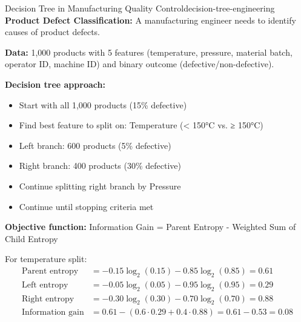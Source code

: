 \documentclass[12pt]{article}
\begin{document}
\begin{example}{Decision Tree in Manufacturing Quality Control}{decision-tree-engineering}
\textbf{Product Defect Classification:} A manufacturing engineer needs to identify causes of product defects.

\textbf{Data:} 1,000 products with 5 features (temperature, pressure, material batch, operator ID, machine ID) and binary outcome (defective/non-defective).

\textbf{Decision tree approach:}
\begin{itemize}
    \item Start with all 1,000 products (15\% defective)
    \item Find best feature to split on: Temperature (< 150°C vs. ≥ 150°C)
    \item Left branch: 600 products (5\% defective)
    \item Right branch: 400 products (30\% defective)
    \item Continue splitting right branch by Pressure
    \item Continue until stopping criteria met
\end{itemize}

\textbf{Objective function:} Information Gain = Parent Entropy - Weighted Sum of Child Entropy

For temperature split:
\begin{align}
\text{Parent entropy} &= -0.15\log_2(0.15) - 0.85\log_2(0.85) = 0.61 \\
\text{Left entropy} &= -0.05\log_2(0.05) - 0.95\log_2(0.95) = 0.29 \\
\text{Right entropy} &= -0.30\log_2(0.30) - 0.70\log_2(0.70) = 0.88 \\
\text{Information gain} &= 0.61 - (0.6 \cdot 0.29 + 0.4 \cdot 0.88) = 0.61 - 0.53 = 0.08
\end{align}

\begin{center}
\end{center}
\end{example}
\end{document}
